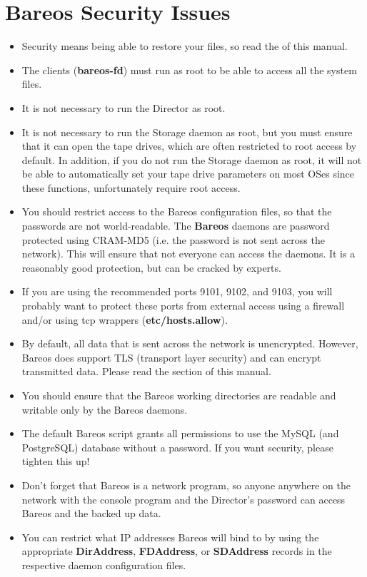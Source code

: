 
\chapter{Bareos Security Issues}
\label{SecurityChapter}

\begin{itemize}
\item Security means being able to restore your files, so read the
    of this manual.
\item The clients ({\bf bareos-fd}) must run as root to be able to access  all
   the system files.
\item It is not necessary to run the Director as root.
\item It is not necessary to run the Storage daemon as root, but you  must
   ensure that it can open the tape drives, which are often restricted to root
   access by default. In addition, if you do not run the Storage daemon as root,
   it will not be able to automatically set your tape drive parameters on most
   OSes since these functions, unfortunately require root access.
\item You should restrict access to the Bareos configuration files,  so that
   the passwords are not world-readable. The {\bf Bareos}  daemons are password
   protected using CRAM-MD5 (i.e. the password is not  sent across the network).
   This will ensure that not everyone  can access the daemons. It is a reasonably
   good protection, but  can be cracked by experts.
\item If you are using the recommended ports 9101, 9102, and 9103, you  will
   probably want to protect these ports from external access  using a firewall
   and/or using tcp wrappers ({\bf etc/hosts.allow}).
\item By default, all data that is sent across the network is unencrypted.
   However, Bareos does support TLS (transport layer security) and can
   encrypt transmitted data.  Please read the
   section of this manual.
\item You should ensure that the Bareos working directories are  readable and
   writable only by the Bareos daemons.
\item The default Bareos  script  grants all
   permissions to use the MySQL (and PostgreSQL) database without a  password. If you want
   security, please tighten this up!
\item Don't forget that Bareos is a network program, so anyone anywhere  on
   the network with the console program and the Director's password  can access
   Bareos and the backed up data.
\item You can restrict what IP addresses Bareos will bind to by using the
   appropriate {\bf DirAddress}, {\bf FDAddress}, or {\bf SDAddress}  records in
   the respective daemon configuration files.
\end{itemize}



